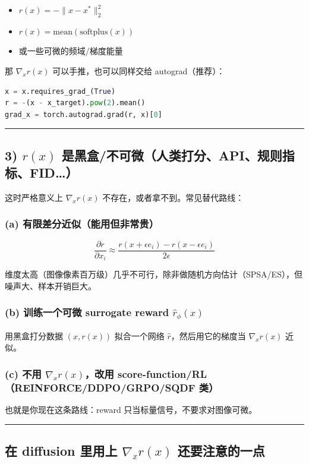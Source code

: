 \begin{itemize}
  \item \(r(x)= -\|x-x^*\|_2^2\)
  \item \(r(x)=\text{mean}(\text{softplus}(x))\)
  \item 或一些可微的频域/梯度能量
\end{itemize}

那 \(\nabla_x r(x)\) 可以手推，也可以同样交给 autograd（推荐）：

\begin{lstlisting}[language=python]
x = x.requires_grad_(True)
r = -(x - x_target).pow(2).mean()
grad_x = torch.autograd.grad(r, x)[0]
\end{lstlisting}

\hrule

\subsection{3) \(r(x)\) 是黑盒/不可微（人类打分、API、规则指标、FID…）}

这时严格意义上 \(\nabla_x r(x)\) 不存在，或者拿不到。常见替代路线：

\subsubsection{(a) 有限差分近似（能用但非常贵）}

\[
\frac{\partial r}{\partial x_i}\approx \frac{r(x+\epsilon e_i)-r(x-\epsilon e_i)}{2\epsilon}
\]

维度太高（图像像素百万级）几乎不可行，除非做随机方向估计（SPSA/ES），但噪声大、样本开销巨大。

\subsubsection{(b) 训练一个可微 surrogate reward \(\hat r_\phi(x)\)}

用黑盒打分数据 \((x, r(x))\) 拟合一个网络 \(\hat r\)，然后用它的梯度当 \(\nabla_x r(x)\) 近似。

\subsubsection{(c) 不用 \(\nabla_x r(x)\)，改用 score-function/RL（REINFORCE/DDPO/GRPO/SQDF 类）}

也就是你现在这条路线：reward 只当标量信号，不要求对图像可微。

\hrule

\subsection{在 diffusion 里用上 \(\nabla_x r(x)\) 还要注意的一点}

